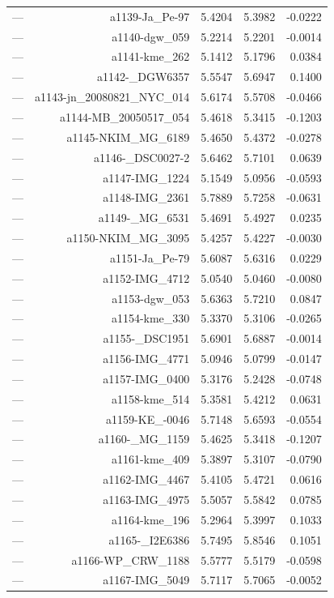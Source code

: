 \begin{table}[htbp]
\begin{tabular}{lrrrr}
— & a1139-Ja_Pe-97 & 5.4204 & 5.3982 & -0.0222 \\
— & a1140-dgw_059 & 5.2214 & 5.2201 & -0.0014 \\
— & a1141-kme_262 & 5.1412 & 5.1796 & 0.0384 \\
— & a1142-_DGW6357 & 5.5547 & 5.6947 & 0.1400 \\
— & a1143-jn_20080821_NYC_014 & 5.6174 & 5.5708 & -0.0466 \\
— & a1144-MB_20050517_054 & 5.4618 & 5.3415 & -0.1203 \\
— & a1145-NKIM_MG_6189 & 5.4650 & 5.4372 & -0.0278 \\
— & a1146-_DSC0027-2 & 5.6462 & 5.7101 & 0.0639 \\
— & a1147-IMG_1224 & 5.1549 & 5.0956 & -0.0593 \\
— & a1148-IMG_2361 & 5.7889 & 5.7258 & -0.0631 \\
— & a1149-_MG_6531 & 5.4691 & 5.4927 & 0.0235 \\
— & a1150-NKIM_MG_3095 & 5.4257 & 5.4227 & -0.0030 \\
— & a1151-Ja_Pe-79 & 5.6087 & 5.6316 & 0.0229 \\
— & a1152-IMG_4712 & 5.0540 & 5.0460 & -0.0080 \\
— & a1153-dgw_053 & 5.6363 & 5.7210 & 0.0847 \\
— & a1154-kme_330 & 5.3370 & 5.3106 & -0.0265 \\
— & a1155-_DSC1951 & 5.6901 & 5.6887 & -0.0014 \\
— & a1156-IMG_4771 & 5.0946 & 5.0799 & -0.0147 \\
— & a1157-IMG_0400 & 5.3176 & 5.2428 & -0.0748 \\
— & a1158-kme_514 & 5.3581 & 5.4212 & 0.0631 \\
— & a1159-KE_-0046 & 5.7148 & 5.6593 & -0.0554 \\
— & a1160-_MG_1159 & 5.4625 & 5.3418 & -0.1207 \\
— & a1161-kme_409 & 5.3897 & 5.3107 & -0.0790 \\
— & a1162-IMG_4467 & 5.4105 & 5.4721 & 0.0616 \\
— & a1163-IMG_4975 & 5.5057 & 5.5842 & 0.0785 \\
— & a1164-kme_196 & 5.2964 & 5.3997 & 0.1033 \\
— & a1165-_I2E6386 & 5.7495 & 5.8546 & 0.1051 \\
— & a1166-WP_CRW_1188 & 5.5777 & 5.5179 & -0.0598 \\
— & a1167-IMG_5049 & 5.7117 & 5.7065 & -0.0052 \\

\end{tabular}
\end{table}
